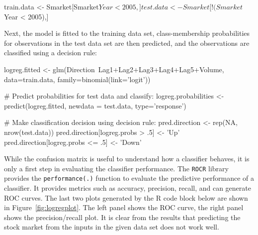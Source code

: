 \begin{samepage}
\begin{Rcode}
train.data <- Smarket[Smarket$Year < 2005,]
test.data <- Smarket[!(Smarket$Year < 2005),]
\end{Rcode}
\end{samepage}

\noindent Next, the model is fitted to the training data set, class-membership probabilities for observations in the test data set are then predicted, and the observations are classified using a decision rule:

\begin{samepage}
\begin{Rcode}
logreg.fitted <- 
   glm(Direction~Lag1+Lag2+Lag3+Lag4+Lag5+Volume, data=train.data,  
            family=binomial(link='logit'))

# Predict probabilities for test data and classify:
logreg.probabilities <- predict(logreg.fitted, newdata = test.data,
                                  type='response')

# Make classification decision using decision rule:
pred.direction <- rep(NA, nrow(test.data))
pred.direction[logreg.probs >  .5] <- 'Up'
pred.direction[logreg.probs <= .5] <- 'Down'
\end{Rcode}
\end{samepage}

While the confusion matrix is useful to understand how a classifier behaves, it is only a first step in evaluating the classifier performance. The \texttt{ROCR} library provides the \texttt{performance(.)} function to evaluate the predictive performance of a classifier. It provides metrics such as accuracy, precision, recall, and can generate ROC curves. The last two plots generated by the R code block below are shown in Figure~\ref{fig:logregplot}. The left panel shows the ROC curve, the right panel shows the precision/recall plot. It is clear from the results that predicting the stock market from the inputs in the given data set does not work well.

\begin{samepage}
\end{samepage}

